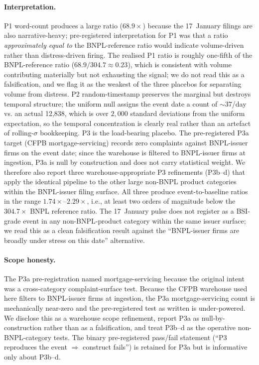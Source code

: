 \documentclass[11pt,letterpaper]{article}
\begin{document}
\paragraph{Interpretation.} P1 word-count produces a large ratio
($68.9\times$) because the 17~January filings are also
narrative-heavy; pre-registered interpretation for P1 was that a ratio
\emph{approximately equal to} the BNPL-reference ratio would indicate
volume-driven rather than distress-driven firing. The realised P1
ratio is roughly one-fifth of the BNPL-reference ratio
($68.9/304.7 \approx 0.23$), which is consistent with volume
contributing materially but not exhausting the signal; we do not read
this as a falsification, and we flag it as the weakest of the three
placebos for separating volume from distress. P2 random-timestamp
preserves the marginal but destroys temporal structure; the uniform
null assigns the event date a count of $\sim 37$/day
vs. an actual 12{,}838, which is over
$2{,}000$ standard deviations from the uniform expectation, so the
temporal concentration is clearly real rather than an artefact of
rolling-$\sigma$ bookkeeping. P3 is the load-bearing placebo. The
pre-registered P3a target (CFPB mortgage-servicing) records zero
complaints against BNPL-issuer firms on the event date; since the
warehouse is filtered to BNPL-issuer firms at ingestion, P3a is null
by construction and does not carry statistical weight. We therefore
also report three warehouse-appropriate P3 refinements (P3b--d) that
apply the identical pipeline to the other large non-BNPL product
categories within the BNPL-issuer filing surface. All three produce
event-to-baseline ratios in the range $1.74\times$--$2.29\times$,
i.e., at least two orders of magnitude below the $304.7\times$ BNPL
reference ratio. The 17~January pulse does not register as a
BSI-grade event in any non-BNPL-product category within the same
issuer surface; we read this as a clean falsification result against
the ``BNPL-issuer firms are broadly under stress on this date''
alternative.

\paragraph{Scope honesty.} The P3a pre-registration named
mortgage-servicing because the original intent was a cross-category
complaint-surface test. Because the CFPB warehouse used here filters
to BNPL-issuer firms at ingestion, the P3a mortgage-servicing count
is mechanically near-zero and the pre-registered test as written is
under-powered. We disclose this as a warehouse scope refinement,
report P3a as null-by-construction rather than as a falsification, and
treat P3b--d as the operative non-BNPL-category tests. The binary
pre-registered pass/fail statement (``P3 reproduces the event
$\Rightarrow$ construct fails'') is retained for P3a but is
informative only about P3b--d.
\end{document}
